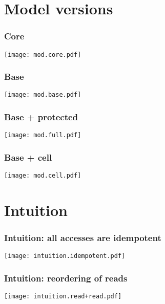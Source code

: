 \section{Model versions}

\begin{frame}
    \frametitle{Core}
    \texttt{[image: mod.core.pdf]}
\end{frame}

\begin{frame}
    \frametitle{Base}
    \texttt{[image: mod.base.pdf]}
\end{frame}

\begin{frame}
    \frametitle{Base + protected}
    \texttt{[image: mod.full.pdf]}
\end{frame}

\begin{frame}
    \frametitle{Base + cell}
    \texttt{[image: mod.cell.pdf]}
\end{frame}

\section{Intuition}

\begin{frame}
    \frametitle{Intuition: all accesses are idempotent}
    \texttt{[image: intuition.idempotent.pdf]}
\end{frame}

\begin{frame}
    \frametitle{Intuition: reordering of reads}
    \texttt{[image: intuition.read+read.pdf]}
\end{frame}
